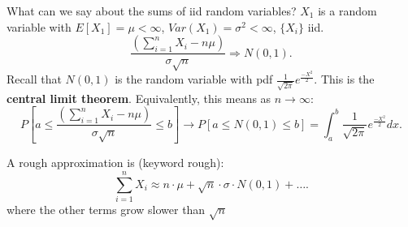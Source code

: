 \documentclass[a4paper]{article}
\begin{document}
\begin{theorem}
  What can we say about the sums of iid random variables? $X_1$ is a random variable with  $E[X_1] = \mu < \infty$,  $Var(X_1) = \sigma^{2} < \infty$, $\{X_i\}$ iid. 
  \[
  \frac{(\sum_{i=1}^{n} X_i - n \mu)}{\sigma \sqrt{n}} \Rightarrow N(0,1)
  .\] 
  Recall that $N(0,1)$ is the random variable with pdf  $\frac{1}{\sqrt{2 \pi}} e^{\frac{-X^{2}}{2}}$. This is the \textbf{central limit theorem}. Equivalently, this means as $n \to \infty$:
  \[
    P[a \leq \frac{(\sum_{i=1}^{n} X_i - n \mu)}{\sigma \sqrt{n}} \leq b] \to P[a \leq N(0,1) \leq b] = \int_{a}^{b} \frac{1}{\sqrt{2 \pi}} e^{\frac{-X^{2}}{2}} dx
  .\] 
\end{theorem}
\begin{lemma}
  A rough approximation is (keyword rough):
  \[
  \sum_{i=1}^{n} X_i \approx n \cdot \mu + \sqrt{n} \cdot \sigma \cdot N(0,1) + \ldots  
  .\] 
  where the other terms grow slower than  $\sqrt{n} $
\end{lemma}
\end{document}
